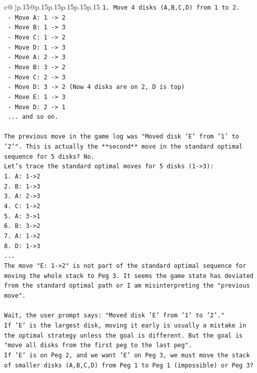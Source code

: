 \documentclass{article}
\begin{document}
{\begin{supertabular}{c@{$\;$}|p{.15\linewidth}@{}p{.15\linewidth}p{.15\linewidth}p{.15\linewidth}p{.15\linewidth}p{.15\linewidth}}
{{{\texttt{1. Move 4 disks (A,B,C,D) from 1 to 2.} \\
\texttt{   {-} Move A: 1 {-}> 2} \\
\texttt{   {-} Move B: 1 {-}> 3} \\
\texttt{   {-} Move C: 1 {-}> 2} \\
\texttt{   {-} Move D: 1 {-}> 3} \\
\texttt{   {-} Move A: 2 {-}> 3} \\
\texttt{   {-} Move B: 3 {-}> 2} \\
\texttt{   {-} Move C: 2 {-}> 3} \\
\texttt{   {-} Move D: 3 {-}> 2 (Now 4 disks are on 2, D is top)} \\
\texttt{   {-} Move E: 1 {-}> 3} \\
\texttt{   {-} Move D: 2 {-}> 1} \\
\texttt{   ... and so on.} \\
\\ 
\texttt{The previous move in the game log was "Moved disk 'E' from '1' to '2'". This is actually the **second** move in the standard optimal sequence for 5 disks? No.} \\
\texttt{Let's trace the standard optimal moves for 5 disks (1{-}>3):} \\
\texttt{1. A: 1{-}>2} \\
\texttt{2. B: 1{-}>3} \\
\texttt{3. A: 2{-}>3} \\
\texttt{4. C: 1{-}>2} \\
\texttt{5. A: 3{-}>1} \\
\texttt{6. B: 3{-}>2} \\
\texttt{7. A: 1{-}>2} \\
\texttt{8. D: 1{-}>3} \\
\texttt{...} \\
\texttt{The move "E: 1{-}>2" is not part of the standard optimal sequence for moving the whole stack to Peg 3. It seems the game state has deviated from the standard optimal path or I am misinterpreting the "previous move".} \\
\\ 
\texttt{Wait, the user prompt says: "Moved disk 'E' from '1' to '2'."} \\
\texttt{If 'E' is the largest disk, moving it early is usually a mistake in the optimal strategy unless the goal is different. But the goal is "move all disks from the first peg to the last peg".} \\
\texttt{If 'E' is on Peg 2, and we want 'E' on Peg 3, we must move the stack of smaller disks (A,B,C,D) from Peg 1 to Peg 1 (impossible) or Peg 3?} \\
}}}
\end{supertabular}}
\end{document}
